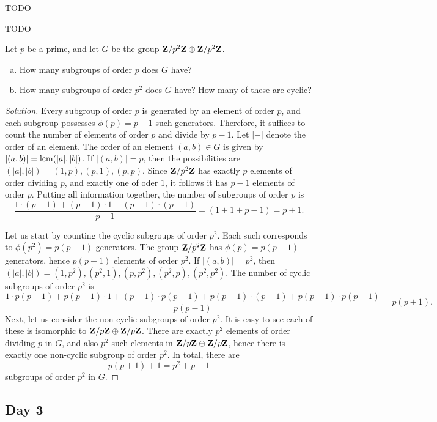 
TODO


TODO


Let $p$ be a prime, and let $G$ be the group $\mathbf{Z}/p^2\mathbf{Z} \oplus \mathbf{Z}/p^2\mathbf{Z}$.
\begin{enumerate}[(a)]
\item How many subgroups of order $p$ does $G$ have?
\item How many subgroups of order $p^2$ does $G$ have? How many of these are cyclic?
\end{enumerate}

\begin{proof}[Solution]
  Every subgroup of order $p$ is generated by an element of order $p$, and each subgroup possesses $\phi(p) = p-1$ such generators. Therefore, it suffices to count the number of elements of order $p$ and divide by $p-1$. Let $|-|$ denote the order of an element. The order of an element $(a,b) \in G$ is given by $|(a,b)| = \operatorname{lcm}(|a|,|b|)$. If $|(a,b)| = p$, then the possibilities are $(|a|,|b|) = (1,p),(p,1),(p,p)$. Since $\mathbf{Z}/p^2\mathbf{Z}$ has exactly $p$ elements of order dividing $p$, and exactly one of oder $1$, it follows it has $p-1$ elements of order $p$. Putting all information together, the number of subgroups of order $p$ is
  \[
  \frac{1 \cdot (p-1) + (p-1) \cdot 1 + (p-1) \cdot (p-1)}{p-1} =
  (1 + 1 + p-1) = p+1.
  \]
  
  Let us start by counting the cyclic subgroups of order $p^2$. Each such corresponds to $\phi(p^2) = p(p-1)$ generators. The group $\mathbf{Z}/p^2\mathbf{Z}$ has $\phi(p) = p(p-1)$ generators, hence $p(p-1)$ elements of order $p^2$. If $|(a,b)| = p^2$, then $(|a|,|b|) = (1,p^2), (p^2,1), (p,p^2), (p^2,p), (p^2,p^2)$. The number of cyclic subgroups of order $p^2$ is
  \[
  \frac{ 1 \cdot p(p-1) + p(p-1) \cdot 1 + (p-1) \cdot p(p-1) + p(p-1) \cdot (p-1) + p(p-1) \cdot p(p-1)}{p(p-1)} =
  p(p+1).
  \]
  Next, let us consider the non-cyclic subgroups of order $p^2$. It is easy to see each of these is isomorphic to $\mathbf{Z}/p\mathbf{Z} \oplus \mathbf{Z}/p\mathbf{Z}$. There are exactly $p^2$ elements of order dividing $p$ in $G$, and also $p^2$ such elements in $\mathbf{Z}/p\mathbf{Z} \oplus \mathbf{Z}/p\mathbf{Z}$, hence there is exactly one non-cyclic subgroup of order $p^2$. In total, there are
  \[
  p(p+1) + 1 = p^2 + p + 1
  \]
  subgroups of order $p^2$ in $G$.
\end{proof}

\subsection{Day 3}
\label{S:spring-2010-3}
\mbox{}

